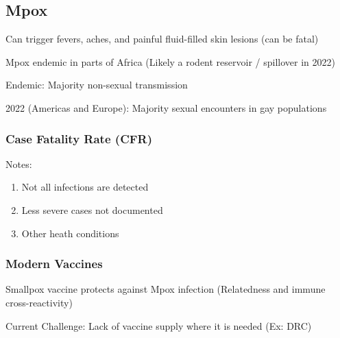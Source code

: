\documentclass{notes}
\begin{document}
\subsection{Mpox}

Can trigger fevers, aches, and painful fluid-filled skin lesions (can be fatal)

Mpox endemic in parts of Africa (Likely a rodent reservoir / spillover in 2022)

Endemic: Majority non-sexual transmission

2022 (Americas and Europe): Majority sexual encounters in gay populations

\subsubsection{Case Fatality Rate (CFR)}


Notes:

\begin{enumerate}
    \item Not all infections are detected
    \item Less severe cases not documented
    \item Other heath conditions
\end{enumerate}

\subsubsection{Modern Vaccines}

Smallpox vaccine protects against Mpox infection (Relatedness and immune cross-reactivity)

Current Challenge: Lack of vaccine supply where it is needed (Ex: DRC)
\end{document}
